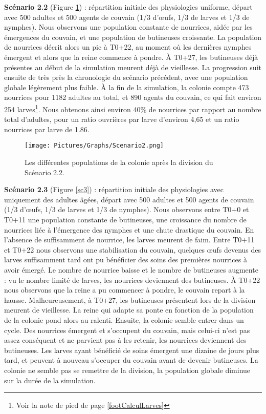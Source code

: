 		\textbf{Scénario 2.2} (Figure \ref{sc2}) : répartition initiale des physiologies uniforme, départ avec 500 adultes et 500 agents de couvain (1/3 d'œufs, 1/3 de larves et 1/3 de nymphes). Nous observons une population constante de nourrices, aidée par les émergences du couvain, et une population de butineuses croissante. La population de nourrices décrit alors un pic à T0+22, au moment où les dernières nymphes émergent et alors que la reine commence à pondre. À T0+27, les butineuses déjà présentes au début de la simulation meurent déjà de vieillesse. La progression suit ensuite de très près la chronologie du scénario précédent, avec une population globale légèrement plus faible. À la fin de la simulation, la colonie compte 473 nourrices pour 1182 adultes au total, et 890 agents du couvain, ce qui fait environ 254 larves\footnote{Voir la note de pied de page \ref{footCalculLarves}}. Nous obtenons ainsi environ 40\% de nourrices par rapport au nombre total d'adultes, pour un ratio ouvrières par larve d'environ 4,65 et un ratio nourrices par larve de 1.86.
	
	\begin{figure}
	\centering
	\texttt{[image: Pictures/Graphs/Scenario2.png]}
	\caption{Les différentes populations de la colonie après la division du Scénario 2.2.}
	\label{sc2}
	\end{figure}
		
		\textbf{Scénario 2.3} (Figure \ref{sc3}) : répartition initiale des physiologies avec uniquement des adultes âgées, départ avec 500 adultes et 500 agents de couvain (1/3 d'œufs, 1/3 de larves et 1/3 de nymphes). Nous observons entre T0+0 et T0+11 une population constante de butineuses, une croissance du nombre de nourrices liée à l'émergence des nymphes et une chute drastique du couvain. En l'absence de suffisamment de nourrice, les larves meurent de faim. Entre T0+11 et T0+22 nous observons une stabilisation du couvain, quelques œufs devenus des larves suffisamment tard ont pu bénéficier des soins des premières nourrices à avoir émergé. Le nombre de nourrice baisse et le nombre de butineuses augmente : vu le nombre limité de larves, les nourrices deviennent des butineuses. À T0+22 nous observons que la reine a pu commencer à pondre, le couvain repart à la hausse. Malheureusement, à T0+27, les butineuses présentent lors de la division meurent de vieillesse. La reine qui adapte sa ponte en fonction de la population de la colonie pond alors au ralenti. Ensuite, la colonie semble entrer dans un cycle. Des nourrices émergent et s'occupent du couvain, mais celui-ci n'est pas assez conséquent et ne parvient pas à les retenir, les nourrices deviennent des butineuses. Les larves ayant bénéficié de soins émergent une dizaine de jours plus tard, et peuvent à nouveau s'occuper du couvain avant de devenir butineuses. La colonie ne semble pas se remettre de la division, la population globale diminue sur la durée de la simulation.
	
